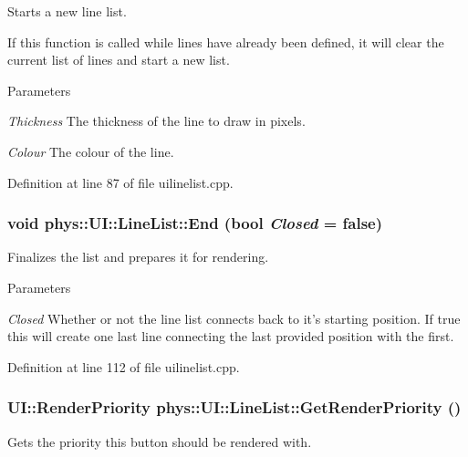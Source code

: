 Starts a new line list. 

If this function is called while lines have already been defined, it will clear the current list of lines and start a new list. 
\begin{DoxyParams}{Parameters}
\item[{\em Thickness}]The thickness of the line to draw in pixels. \item[{\em Colour}]The colour of the line. \end{DoxyParams}


Definition at line 87 of file uilinelist.cpp.

\hypertarget{classphys_1_1UI_1_1LineList_a8ea40817665ec539b4ff97a64b73317f}{
\subsubsection[{End}]{\setlength{\rightskip}{0pt plus 5cm}void phys::UI::LineList::End (bool {\em Closed} = {\ttfamily false})}}
\label{d7/de8/classphys_1_1UI_1_1LineList_a8ea40817665ec539b4ff97a64b73317f}


Finalizes the list and prepares it for rendering. 


\begin{DoxyParams}{Parameters}
\item[{\em Closed}]Whether or not the line list connects back to it's starting position. If true this will create one last line connecting the last provided position with the first. \end{DoxyParams}


Definition at line 112 of file uilinelist.cpp.

\hypertarget{classphys_1_1UI_1_1LineList_a95aa150344304a49d8f6c6024d6a5351}{
\subsubsection[{GetRenderPriority}]{\setlength{\rightskip}{0pt plus 5cm}UI::RenderPriority phys::UI::LineList::GetRenderPriority ()}}
\label{d7/de8/classphys_1_1UI_1_1LineList_a95aa150344304a49d8f6c6024d6a5351}


Gets the priority this button should be rendered with. 

